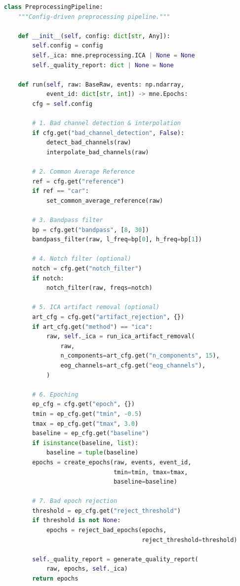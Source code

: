 \begin{lstlisting}[language=Python, caption={预处理流水线 \texttt{src/preprocessing/pipeline.py}\label{code:pipeline}}]
class PreprocessingPipeline:
    """Config-driven preprocessing pipeline."""

    def __init__(self, config: dict[str, Any]):
        self.config = config
        self._ica: mne.preprocessing.ICA | None = None
        self._quality_report: dict | None = None

    def run(self, raw: BaseRaw, events: np.ndarray,
            event_id: dict[str, int]) -> mne.Epochs:
        cfg = self.config

        # 1. Bad channel detection & interpolation
        if cfg.get("bad_channel_detection", False):
            detect_bad_channels(raw)
            interpolate_bad_channels(raw)

        # 2. Common Average Reference
        ref = cfg.get("reference")
        if ref == "car":
            set_common_average_reference(raw)

        # 3. Bandpass filter
        bp = cfg.get("bandpass", [8, 30])
        bandpass_filter(raw, l_freq=bp[0], h_freq=bp[1])

        # 4. Notch filter (optional)
        notch = cfg.get("notch_filter")
        if notch:
            notch_filter(raw, freqs=notch)

        # 5. ICA artifact removal (optional)
        art_cfg = cfg.get("artifact_rejection", {})
        if art_cfg.get("method") == "ica":
            raw, self._ica = run_ica_artifact_removal(
                raw,
                n_components=art_cfg.get("n_components", 15),
                eog_channels=art_cfg.get("eog_channels"),
            )

        # 6. Epoching
        ep_cfg = cfg.get("epoch", {})
        tmin = ep_cfg.get("tmin", -0.5)
        tmax = ep_cfg.get("tmax", 3.0)
        baseline = ep_cfg.get("baseline")
        if isinstance(baseline, list):
            baseline = tuple(baseline)
        epochs = create_epochs(raw, events, event_id,
                               tmin=tmin, tmax=tmax,
                               baseline=baseline)

        # 7. Bad epoch rejection
        threshold = ep_cfg.get("reject_threshold")
        if threshold is not None:
            epochs = reject_bad_epochs(epochs,
                                       reject_threshold=threshold)

        self._quality_report = generate_quality_report(
            raw, epochs, self._ica)
        return epochs
\end{lstlisting}

